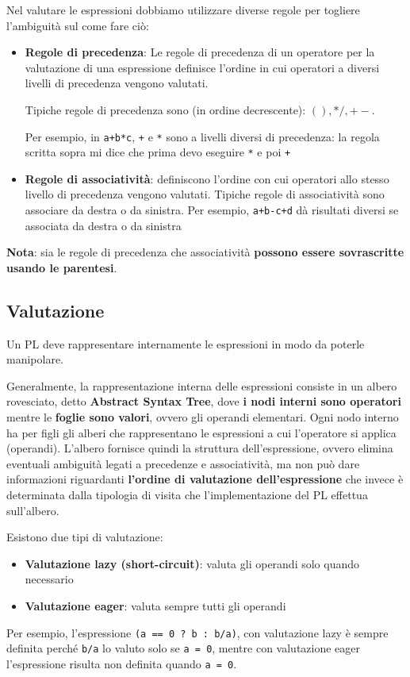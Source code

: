 \documentclass[12pt,a4paper]{article}
\begin{document}
\clearpage

Nel valutare le espressioni dobbiamo utilizzare diverse regole per togliere l'ambiguità sul come fare ciò:
\begin{itemize}
\item \textbf{Regole di precedenza}: Le regole di precedenza di un operatore per la valutazione di una espressione definisce l'ordine in cui operatori a diversi livelli di precedenza vengono valutati.

Tipiche regole di precedenza sono (in ordine decrescente): $(), */ , +-$.

Per esempio, in \texttt{a+b*c}, \texttt{+} e \texttt{*} sono a livelli diversi di precedenza: la regola scritta sopra mi dice che prima devo eseguire \texttt{*} e poi \texttt{+}

\item \textbf{Regole di associatività}: definiscono l'ordine con cui operatori allo stesso livello di precedenza vengono valutati. Tipiche regole di associatività sono associare da destra o da sinistra.
Per esempio, \texttt{a+b-c+d} dà risultati diversi se associata da destra o da sinistra
\end{itemize}

\textbf{Nota}: sia le regole di precedenza che associatività \textbf{possono essere sovrascritte usando le parentesi}.

\subsection{Valutazione}
Un PL deve rappresentare internamente le espressioni in modo da poterle manipolare.

Generalmente, la rappresentazione interna delle espressioni consiste in un albero rovesciato, detto \textbf{Abstract Syntax Tree}, dove \textbf{i nodi interni sono operatori} mentre le \textbf{foglie sono valori}, ovvero gli operandi elementari. Ogni nodo interno ha per figli gli alberi che rappresentano le espressioni a cui l'operatore si applica (operandi). L'albero fornisce quindi la struttura dell'espressione, ovvero elimina eventuali ambiguità legati a precedenze e associatività, ma non può dare informazioni riguardanti \textbf{l'ordine di valutazione dell'espressione} che invece è determinata dalla tipologia di visita che l'implementazione del PL effettua sull'albero.

Esistono due tipi di valutazione:
\begin{itemize}
\item \textbf{Valutazione lazy (short-circuit)}: valuta gli operandi solo quando necessario
\item \textbf{Valutazione eager}: valuta sempre tutti gli operandi
\end{itemize}
Per esempio, l'espressione \texttt{(a == 0 ? b : b/a)}, con valutazione lazy è sempre definita perché  \texttt{b/a} lo valuto solo se \texttt{a = 0}, mentre con valutazione eager l'espressione risulta non definita quando \texttt{a = 0}.
\end{document}
